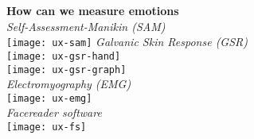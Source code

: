 \textbf{How can we measure emotions}\\
{\Large\textit{Self-Assessment-Manikin (SAM)}\\
\texttt{[image: ux-sam]}
\textit{Galvanic Skin Response (GSR)}\\
\texttt{[image: ux-gsr-hand]}\\
\texttt{[image: ux-gsr-graph]}\\
\textit{Electromyography (EMG)}\\
\texttt{[image: ux-emg]}\\
\textit{Facereader software}\\
\texttt{[image: ux-fs]}\\}
